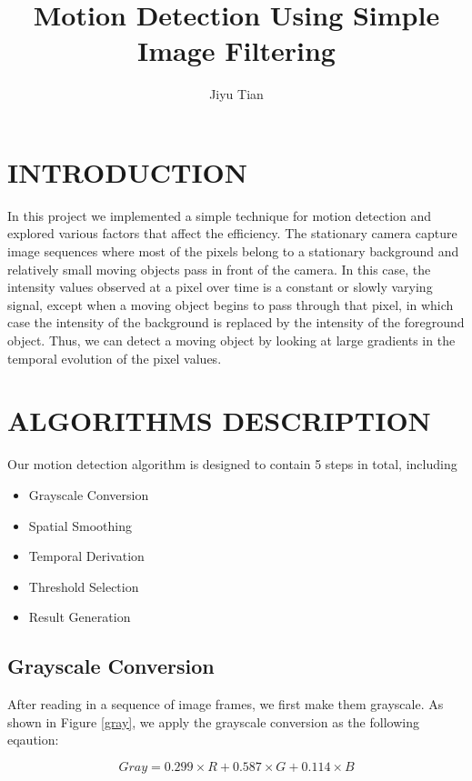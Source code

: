 \documentclass[letterpaper, 10 pt, conference]{ieeeconf}
\title{\Huge Motion Detection Using Simple Image Filtering}
\author{Jiyu Tian}
\begin{document}
\maketitle
\thispagestyle{empty}
\pagestyle{empty}


\section{INTRODUCTION}
In this project we implemented a simple technique for motion detection and explored various factors that affect the efficiency. The stationary camera capture image sequences where most of the pixels belong to a stationary background and relatively small moving objects pass in front of the camera. In this case, the intensity values observed at a pixel over time is a constant or slowly varying signal, except when a moving object begins to pass through that pixel, in which case the intensity of the background is replaced by the intensity of the foreground object. Thus, we can detect a moving object by looking at large gradients in the temporal evolution of the pixel values.

\section{ALGORITHMS DESCRIPTION}
Our motion detection algorithm is designed to contain 5 steps in total, including 
\begin{itemize}
    \item Grayscale Conversion
    \item Spatial Smoothing
    \item Temporal Derivation
    \item Threshold Selection
    \item Result Generation
\end{itemize}
\subsection{Grayscale Conversion}
After reading in a sequence of image frames, we first make them grayscale. As shown in Figure \ref{gray}, we apply the grayscale conversion as the following eqaution:

\begin{equation}
Gray = 0.299 \times R + 0.587 \times G + 0.114 \times B
\end{equation}
\end{document}
